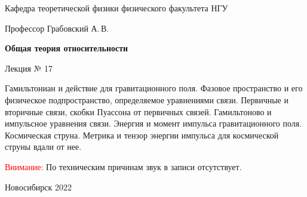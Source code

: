 \documentclass[12pt,pagesize,paper=192mm:108mm,landscape]{scrbook}
\begin{document}
\begin{titlepage}
\begin{center}
    Кафедра теоретической физики физического факультета НГУ
    \medskip

    \Large
    Профессор Грабовский А.\,В.
    \smallskip

    \huge
    \textbf{Общая теория относительности}
    \smallskip

    \Large
    Лекция № 17
    \vfill

    
    \normalsize
    \begin{minipage}{0.85\linewidth}
      Гамильтониан и действие для гравитационного поля. Фазовое
      пространство и его физическое подпространство, определяемое
      уравнениями связи. Первичные и вторичные связи, скобки Пуассона
      от первичных связей. Гамильтоново и импульсное уравнения
      связи. Энергия и момент импульса гравитационного
      поля. Космическая струна. Метрика и тензор энергии импульса для
      космической струны вдали от нее.
     \end{minipage}
    \vfill

    \begin{minipage}{0.90\linewidth}
      \textcolor{red}{Внимание:} По техническим причинам звук в записи отсутствует.
    \end{minipage}
  
  \normalsize \ccbysa\hspace{0.5em}  Новосибирск 2022
  \end{center}

\end{titlepage}
\end{document}
